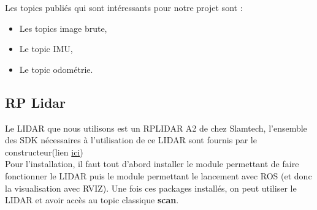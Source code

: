 \documentclass[french]{rapportENSTAB}
\begin{document}
Les topics publiés qui sont intéressants pour notre projet sont : \begin{itemize}[label=\textbullet, font=\small\color{blue}]
    \item Les topics image brute,
    \item Le topic IMU,
    \item Le topic odométrie. 
\end{itemize}



\subsection{RP Lidar}
Le LIDAR que nous utilisons est un RPLIDAR A2 de chez Slamtech, l'ensemble des SDK nécessaires à l'utilisation de ce LIDAR sont fournis par le constructeur(lien \href{https://www.slamtec.com/en/Support#rplidar-a-series}{ici}) \\

Pour l'installation, il faut tout d'abord installer le module permettant de faire fonctionner le LIDAR puis le module permettant le lancement avec ROS (et donc la visualisation avec RVIZ). Une fois ces packages installés, on peut utiliser le LIDAR et avoir accès au topic classique \textbf{scan}. \\
\\
\end{document}

